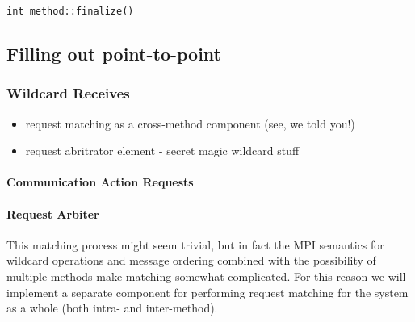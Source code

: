 \begin{verbatim}
int method::finalize()
\end{verbatim}


\subsection{Filling out point-to-point}

\subsubsection{Wildcard Receives}
\begin{itemize}
  \item request matching as a cross-method component (see, we told you!)
  \item request abritrator element - secret magic wildcard stuff
\end{itemize}

\paragraph{Communication Action Requests}

\paragraph{Request Arbiter}

%

This matching process might seem trivial, but in fact the MPI semantics for
wildcard operations and message ordering combined with the possibility of
multiple methods make matching somewhat complicated.
For this reason we will implement a separate 
component for performing request matching for the
system as a whole (both intra- and inter-method).

